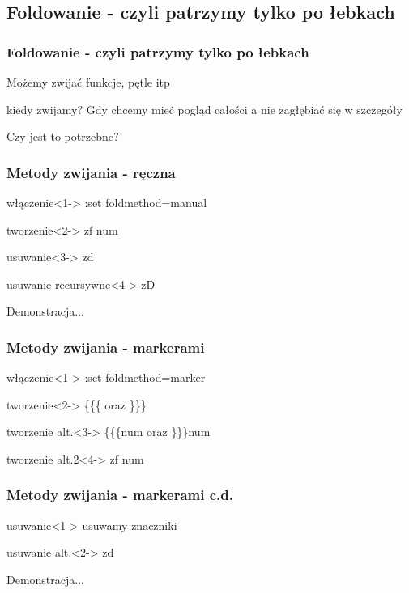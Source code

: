 \documentclass{beamer}
\begin{document}
\subsection{Foldowanie - czyli patrzymy tylko po łebkach}
\begin{frame}
	\frametitle{Foldowanie - czyli patrzymy tylko po łebkach}
	{
		Możemy zwijać funkcje, pętle itp\\
	}
	\uncover<2->
	{
		\begin{block}{kiedy zwijamy?}
			Gdy chcemy mieć pogląd całości a nie zagłębiać się w szczegóły
		\end{block}
	}
	{
		Czy jest to potrzebne?
	}
\end{frame}
\begin{frame}
	\frametitle{Metody zwijania - ręczna}
	\begin{block}{włączenie}<1->
	:set foldmethod=manual
	\end{block}
	\begin{block}{tworzenie}<2->
	zf num
	\end{block}
	\begin{block}{usuwanie}<3->
	zd
	\end{block}
	\begin{block}{usuwanie recursywne}<4->
	zD
	\end{block}
	{
		Demonstracja...
	}
\end{frame}
\begin{frame}
	\frametitle{Metody zwijania - markerami}
	\begin{block}{włączenie}<1->
	:set foldmethod=marker
	\end{block}
	\begin{block}{tworzenie}<2->
	\{\{\{ oraz \}\}\}
	\end{block}
	\begin{block}{tworzenie alt.}<3->
	\{\{\{num oraz \}\}\}num
	\end{block}
	\begin{block}{tworzenie alt.2}<4->
	zf num
	\end{block}
\end{frame}
\begin{frame}
	\frametitle{Metody zwijania - markerami c.d.}
	\begin{block}{usuwanie}<1->
	usuwamy znaczniki
	\end{block}
	\begin{block}{usuwanie alt.}<2->
	zd
	\end{block}
	{
		Demonstracja...
	}
\end{frame}
\end{document}
